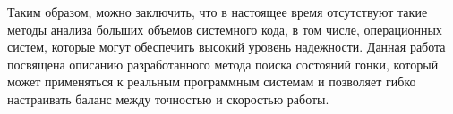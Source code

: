 Таким образом, можно заключить, что в настоящее время отсутствуют такие методы анализа больших объемов системного кода, в том числе, операционных систем, которые могут обеспечить высокий уровень надежности.
Данная работа посвящена описанию разработанного метода поиска состояний гонки, который может применяться к реальным программным системам и позволяет гибко настраивать баланс между точностью и скоростью работы.




%
%
%
%
%

